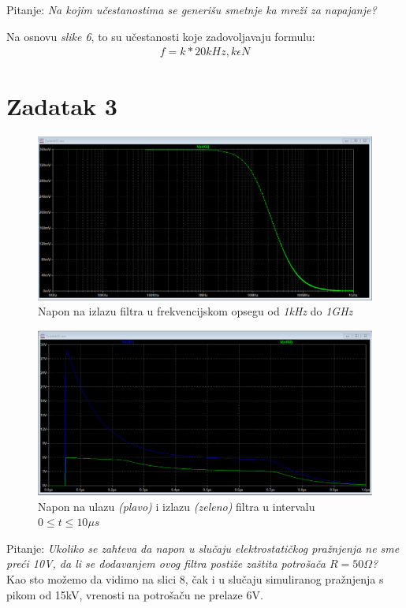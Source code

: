 \documentclass{article}
\begin{document}
Pitanje: \emph{Na kojim učestanostima se generišu smetnje ka mreži za napajanje?\\}

Na osnovu \emph{slike 6}, to su učestanosti koje zadovoljavaju formulu:
\begin{align}
    f=k*20kHz, k\epsilon N
\end{align}

\section*{Zadatak 3}

\begin{figure}[H]
    \begin{center}
        \includegraphics[width=\textwidth]{Zadatak03_1.png}
        \caption[]{Napon na izlazu filtra u frekvencijskom opsegu od \emph{1kHz} do \emph{1GHz}}
    \end{center}
\end{figure}

\begin{figure}[H]
    \begin{center}
        \includegraphics[width=\textwidth]{Zadatak03_2.png}
        \caption[]{Napon na ulazu \emph{(plavo)} i izlazu \emph{(zeleno)} filtra u intervalu \emph{$0 \le t \le 10\mu s$}}
    \end{center}
\end{figure}

Pitanje:
\emph{Ukoliko se zahteva da napon u slučaju elektrostatičkog pražnjenja
 ne sme preći 10V, da li se dodavanjem ovog filtra postiže zaštita potrošača $R=50\Omega$?}\\

Kao sto možemo da vidimo na slici 8, čak i u slučaju simuliranog pražnjenja s pikom od 15kV, vrenosti na potrošaču ne prelaze 6V.
\end{document}
